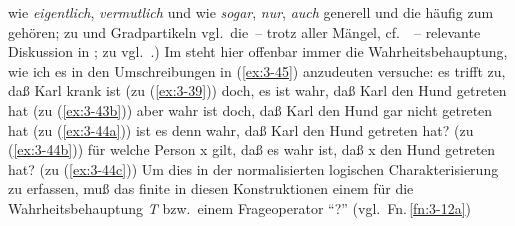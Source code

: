 \documentclass[output=paper]{langsci/langscibook}
\begin{document}
 wie \textit{eigentlich}, \textit{vermutlich} und  wie \textit{sogar}, \textit{nur}, \textit{auch}
generell und die  häufig zum  gehören; zu  und
Gradpartikeln vgl.\ die~-- trotz aller Mängel, cf.\ \citet[266-73]{Hust76}~-- relevante Diskussion in
\citet[Kapitel 6 und 8.6]{Jackendoff72}; zu 
vgl.\ \citet{Verhagen79}.) Im  steht hier offenbar immer die
Wahrheitsbehauptung, wie ich es in den Umschreibungen in (\ref{ex:3-45})
anzudeuten versuche:
\eal \label{ex:3-45}
\ex
\label{ex:3-45a}
es trifft zu, daß Karl krank ist (zu (\ref{ex:3-39}))
\ex
\label{ex:3-45b}
doch, es ist wahr, daß Karl den Hund getreten hat (zu (\ref{ex:3-43b}))
\ex
\label{ex:3-45c}
aber wahr ist doch, daß Karl den Hund gar nicht getreten hat (zu (\ref{ex:3-44a}))
\ex
\label{ex:3-45d}
ist es denn wahr, daß Karl den Hund getreten hat? (zu (\ref{ex:3-44b}))
\ex
\label{ex:3-45e}
für welche Person x gilt, daß es wahr ist, daß x den Hund getreten hat? (zu (\ref{ex:3-44c}))
\zl
Um dies in der normalisierten logischen Charakterisierung zu erfassen,
muß das finite  in diesen Konstruktionen einem  für die
Wahrheitsbehauptung \textit{T} bzw.\ einem Frageoperator "`?"' (vgl.\ Fn.\,\ref{fn:3-12a})
\end{document}
